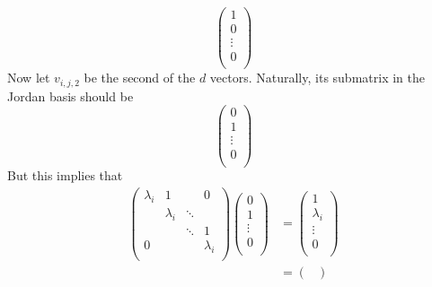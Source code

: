 \documentclass[../notes.tex]{subfiles}
\begin{document}
\begin{itemize}
\begin{enumerate}
\begin{enumerate}
\begin{equation*}
\begin{pmatrix}
                    1\\
                    0\\
                    \vdots\\
                    0\\
                \end{pmatrix}
            \end{equation*}
            Now let $v_{i,j,2}$ be the second of the $d$ vectors. Naturally, its submatrix in the Jordan basis should be
            \begin{equation*}
                \begin{pmatrix}
                    0\\
                    1\\
                    \vdots\\
                    0\\
                \end{pmatrix}
            \end{equation*}
            But this implies that
            \begin{align*}
                \begin{pmatrix}
                    \lambda_i & 1 &  & 0\\
                     & \lambda_i & \ddots & \\
                     &  & \ddots & 1\\
                    0 &  &  & \lambda_i\\
                \end{pmatrix}
                \begin{pmatrix}
                    0\\
                    1\\
                    \vdots\\
                    0\\
                \end{pmatrix}
                &=
                \begin{pmatrix}
                    1\\
                    \lambda_i\\
                    \vdots\\
                    0\\
                \end{pmatrix}\\
                &=
                \begin{pmatrix}

\end{pmatrix}
\end{align*}
\end{enumerate}
\end{enumerate}
\end{itemize}
\end{document}
